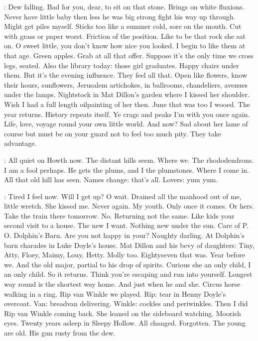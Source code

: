 \Bloom:
Dew falling. Bad for you, dear, to sit on that stone. Brings on white
fluxions. Never have little baby then less he was big strong fight his way
up through. Might get piles myself. Sticks too like a summer cold, sore on
the mouth. Cut with grass or paper worst. Friction of the position.
Like to be that rock she sat on. O sweet little, you don't know how nice
you looked. I begin to like them at that age. Green apples. Grab at all
that offer. Suppose it's the only time we cross legs, seated. Also the
library today: those girl graduates. Happy chairs under them. But it's
the evening influence. They feel all that. Open like flowers, know
their hours, sunflowers, Jerusalem artichokes, in ballrooms, chandeliers,
avenues under the lamps. Nightstock in Mat Dillon's garden where I kissed
her shoulder. Wish I had a full length oilpainting of her then. June
that was too I wooed. The year returns. History repeats itself.
Ye crags and peaks I'm with you once again. Life, love, voyage round
your own little world. And now? Sad about her lame of course but must
be on your guard not to feel too much pity. They take advantage.

\Bloom:
All quiet on Howth now. The distant hills seem. Where we. The
rhododendrons. I am a fool perhaps. He gets the plums, and I the
plumstones. Where I come in. All that old hill has seen. Names change:
that's all. Lovers: yum yum.

\Bloom:
Tired I feel now. Will I get up? O wait. Drained all the manhood out
of me, little wretch. She kissed me. Never again. My youth. Only once it
comes. Or hers. Take the train there tomorrow. No. Returning not the
same. Like kids your second visit to a house. The new I want. Nothing new
under the sun. Care of P. O. Dolphin's Barn. Are you not happy in your?
Naughty darling. At Dolphin's barn charades in Luke Doyle's house. Mat
Dillon and his bevy of daughters: Tiny, Atty, Floey, Maimy, Louy, Hetty.
Molly too. Eightyseven that was. Year before we. And the old major,
partial to his drop of spirits. Curious she an only child, I an only
child. So it returns. Think you're escaping and run into yourself. Longest
way round is the shortest way home. And just when he and she. Circus horse
walking in a ring. Rip van Winkle we played. Rip: tear in Henny Doyle's
overcoat. Van: breadvan delivering. Winkle: cockles and periwinkles. Then
I did Rip van Winkle coming back. She leaned on the sideboard watching.
Moorish eyes. Twenty years asleep in Sleepy Hollow. All changed.
Forgotten. The young are old. His gun rusty from the dew.

